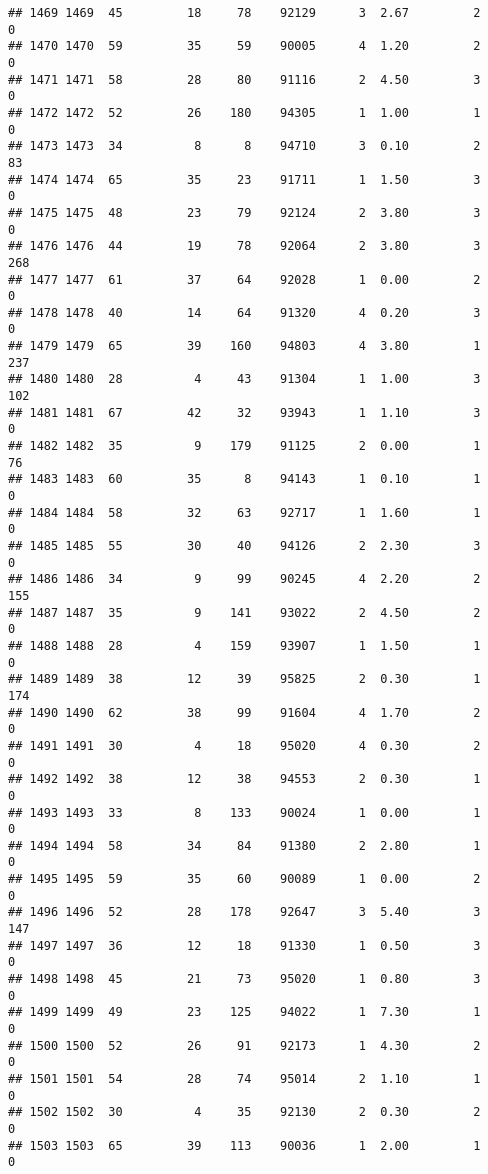\documentclass[
]{article}
\begin{document}
\begin{verbatim}
## 1469 1469  45         18     78    92129      3  2.67         2        0
## 1470 1470  59         35     59    90005      4  1.20         2        0
## 1471 1471  58         28     80    91116      2  4.50         3        0
## 1472 1472  52         26    180    94305      1  1.00         1        0
## 1473 1473  34          8      8    94710      3  0.10         2       83
## 1474 1474  65         35     23    91711      1  1.50         3        0
## 1475 1475  48         23     79    92124      2  3.80         3        0
## 1476 1476  44         19     78    92064      2  3.80         3      268
## 1477 1477  61         37     64    92028      1  0.00         2        0
## 1478 1478  40         14     64    91320      4  0.20         3        0
## 1479 1479  65         39    160    94803      4  3.80         1      237
## 1480 1480  28          4     43    91304      1  1.00         3      102
## 1481 1481  67         42     32    93943      1  1.10         3        0
## 1482 1482  35          9    179    91125      2  0.00         1       76
## 1483 1483  60         35      8    94143      1  0.10         1        0
## 1484 1484  58         32     63    92717      1  1.60         1        0
## 1485 1485  55         30     40    94126      2  2.30         3        0
## 1486 1486  34          9     99    90245      4  2.20         2      155
## 1487 1487  35          9    141    93022      2  4.50         2        0
## 1488 1488  28          4    159    93907      1  1.50         1        0
## 1489 1489  38         12     39    95825      2  0.30         1      174
## 1490 1490  62         38     99    91604      4  1.70         2        0
## 1491 1491  30          4     18    95020      4  0.30         2        0
## 1492 1492  38         12     38    94553      2  0.30         1        0
## 1493 1493  33          8    133    90024      1  0.00         1        0
## 1494 1494  58         34     84    91380      2  2.80         1        0
## 1495 1495  59         35     60    90089      1  0.00         2        0
## 1496 1496  52         28    178    92647      3  5.40         3      147
## 1497 1497  36         12     18    91330      1  0.50         3        0
## 1498 1498  45         21     73    95020      1  0.80         3        0
## 1499 1499  49         23    125    94022      1  7.30         1        0
## 1500 1500  52         26     91    92173      1  4.30         2        0
## 1501 1501  54         28     74    95014      2  1.10         1        0
## 1502 1502  30          4     35    92130      2  0.30         2        0
## 1503 1503  65         39    113    90036      1  2.00         1        0

\end{verbatim}
\end{document}
